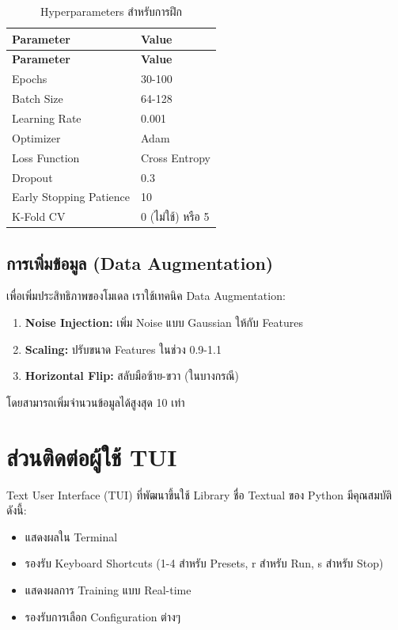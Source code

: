 \documentclass[12pt,a4paper]{report}
\begin{document}
\begin{longtable}{|p{4cm}|p{4cm}|}
\caption{Hyperparameters สำหรับการฝึก}
\label{tab:hyperparameters} \\
\hline
\textbf{Parameter} & \textbf{Value} \\
\hline
\endfirsthead
\hline
\textbf{Parameter} & \textbf{Value} \\
\hline
\endhead
\hline
Epochs & 30-100 \\
\hline
Batch Size & 64-128 \\
\hline
Learning Rate & 0.001 \\
\hline
Optimizer & Adam \\
\hline
Loss Function & Cross Entropy \\
\hline
Dropout & 0.3 \\
\hline
Early Stopping Patience & 10 \\
\hline
K-Fold CV & 0 (ไม่ใช้) หรือ 5 \\
\hline
\end{longtable}

\subsection{การเพิ่มข้อมูล (Data Augmentation)}

เพื่อเพิ่มประสิทธิภาพของโมเดล เราใช้เทคนิค Data Augmentation:

\begin{enumerate}
    \item \textbf{Noise Injection:} เพิ่ม Noise แบบ Gaussian ให้กับ Features
    \item \textbf{Scaling:} ปรับขนาด Features ในช่วง 0.9-1.1
    \item \textbf{Horizontal Flip:} สลับมือซ้าย-ขวา (ในบางกรณี)
\end{enumerate}

โดยสามารถเพิ่มจำนวนข้อมูลได้สูงสุด 10 เท่า

\section{ส่วนติดต่อผู้ใช้ TUI}

Text User Interface (TUI) ที่พัฒนาขึ้นใช้ Library ชื่อ Textual ของ Python 
มีคุณสมบัติดังนี้:

\begin{itemize}
    \item แสดงผลใน Terminal
    \item รองรับ Keyboard Shortcuts (1-4 สำหรับ Presets, r สำหรับ Run, s สำหรับ Stop)
    \item แสดงผลการ Training แบบ Real-time
    \item รองรับการเลือก Configuration ต่างๆ
\end{itemize}
\end{document}

